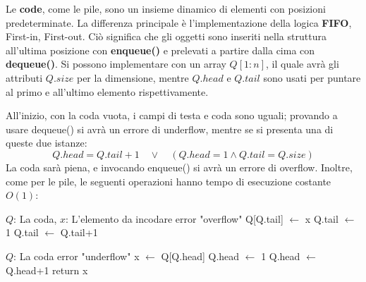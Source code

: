 \noindent Le \textbf{code}, come le pile, sono un insieme dinamico di elementi con posizioni predeterminate. La differenza principale è
l'implementazione della logica \textbf{FIFO}, First-in, First-out. Ciò significa che gli oggetti sono inseriti nella struttura all'ultima posizione con
\textbf{enqueue()} e prelevati a partire dalla cima con \textbf{dequeue()}. Si possono implementare con un array $Q[1:n]$, il quale avrà gli attributi
$Q.size$ per la dimensione, mentre $Q.head$ e $Q.tail$ sono usati per puntare al primo e all'ultimo elemento rispettivamente.\par
All'inizio, con la coda vuota, i campi di testa e coda sono uguali; provando a usare dequeue() si avrà un errore di underflow, mentre se si presenta una
di queste due istanze: \[Q.head = Q.tail+1 \quad\lor\quad (Q.head=1\land Q.tail=Q.size)\]
\noindent La coda sarà piena, e invocando enqueue() si avrà un errore di overflow. Inoltre, come per le pile, le seguenti operazioni hanno tempo di
esecuzione costante $O(1)$:
\begin{algorithm}[h]
	\caption{enqueue(Q, x)}
	\begin{algorithmic}[i]
		\Require $Q$: La coda, $x$: L'elemento da incodare
		\State error "overflow"
		\EndIf
		\State Q[Q.tail] $\gets$ x 
		\State Q.tail $\gets$ 1
		\Else Q.tail $\gets$ Q.tail+1
		\EndIf
	\end{algorithmic}
\end{algorithm}
\begin{algorithm}[h]
	\caption{dequeue(Q)}
	\begin{algorithmic}[i]
		\Require $Q$: La coda
		\State error "underflow"
		\EndIf
		\State x $\gets$ Q[Q.head] 
		\State Q.head $\gets$ 1
		\Else Q.head $\gets$ Q.head+1
		\EndIf
		\State return x
	\end{algorithmic}
\end{algorithm}

%

